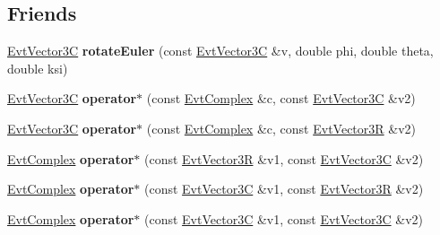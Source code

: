 \subsection*{Friends}
\begin{DoxyCompactItemize}
\item 
\hypertarget{class_evt_vector3_c_aae4da3f2867a033e6038f8dfe7905aab}{}\hyperlink{class_evt_vector3_c}{Evt\+Vector3\+C} {\bfseries rotate\+Euler} (const \hyperlink{class_evt_vector3_c}{Evt\+Vector3\+C} \&v, double phi, double theta, double ksi)\label{class_evt_vector3_c_aae4da3f2867a033e6038f8dfe7905aab}

\item 
\hypertarget{class_evt_vector3_c_af320c4ac28665aa4ab9b28f6b4c723de}{}\hyperlink{class_evt_vector3_c}{Evt\+Vector3\+C} {\bfseries operator$\ast$} (const \hyperlink{class_evt_complex}{Evt\+Complex} \&c, const \hyperlink{class_evt_vector3_c}{Evt\+Vector3\+C} \&v2)\label{class_evt_vector3_c_af320c4ac28665aa4ab9b28f6b4c723de}

\item 
\hypertarget{class_evt_vector3_c_a426528453716280e473a4e0f587f5b9e}{}\hyperlink{class_evt_vector3_c}{Evt\+Vector3\+C} {\bfseries operator$\ast$} (const \hyperlink{class_evt_complex}{Evt\+Complex} \&c, const \hyperlink{class_evt_vector3_r}{Evt\+Vector3\+R} \&v2)\label{class_evt_vector3_c_a426528453716280e473a4e0f587f5b9e}

\item 
\hypertarget{class_evt_vector3_c_a4872990b5f48c2641eeee83edb8ccf07}{}\hyperlink{class_evt_complex}{Evt\+Complex} {\bfseries operator$\ast$} (const \hyperlink{class_evt_vector3_r}{Evt\+Vector3\+R} \&v1, const \hyperlink{class_evt_vector3_c}{Evt\+Vector3\+C} \&v2)\label{class_evt_vector3_c_a4872990b5f48c2641eeee83edb8ccf07}

\item 
\hypertarget{class_evt_vector3_c_a96bd5309c617c2d1691c8c59dbcf043d}{}\hyperlink{class_evt_complex}{Evt\+Complex} {\bfseries operator$\ast$} (const \hyperlink{class_evt_vector3_c}{Evt\+Vector3\+C} \&v1, const \hyperlink{class_evt_vector3_r}{Evt\+Vector3\+R} \&v2)\label{class_evt_vector3_c_a96bd5309c617c2d1691c8c59dbcf043d}

\item 
\hypertarget{class_evt_vector3_c_a8eba7903a6158c27683431428eb5df27}{}\hyperlink{class_evt_complex}{Evt\+Complex} {\bfseries operator$\ast$} (const \hyperlink{class_evt_vector3_c}{Evt\+Vector3\+C} \&v1, const \hyperlink{class_evt_vector3_c}{Evt\+Vector3\+C} \&v2)\label{class_evt_vector3_c_a8eba7903a6158c27683431428eb5df27}


\end{DoxyCompactItemize}
